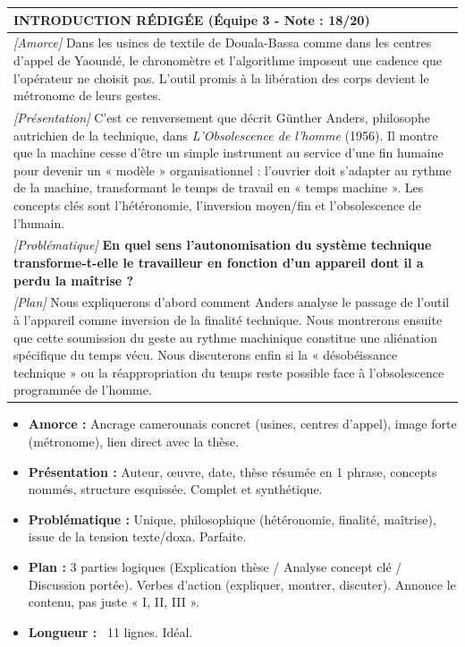 \documentclass[11pt]{article}
\begin{document}
\begin{exoresolu}
\begin{center}
\begin{tabularx}{\linewidth}{|X|}
\hline
\textbf{INTRODUCTION RÉDIGÉE (Équipe 3 - Note : 18/20)} \\ \hline
\textit{[Amorce]} Dans les usines de textile de Douala-Bassa comme dans les centres d'appel de Yaoundé, le chronomètre et l'algorithme imposent une cadence que l'opérateur ne choisit pas. L'outil promis à la libération des corps devient le métronome de leurs gestes. \\
\textit{[Présentation]} C'est ce renversement que décrit Günther Anders, philosophe autrichien de la technique, dans \emph{L'Obsolescence de l'homme} (1956). Il montre que la machine cesse d'être un simple instrument au service d'une fin humaine pour devenir un « modèle » organisationnel : l'ouvrier doit s'adapter au rythme de la machine, transformant le temps de travail en « temps machine ». Les concepts clés sont l'hétéronomie, l'inversion moyen/fin et l'obsolescence de l'humain. \\
\textit{[Problématique]} \textbf{En quel sens l'autonomisation du système technique transforme-t-elle le travailleur en fonction d'un appareil dont il a perdu la maîtrise ?} \\
\textit{[Plan]} Nous expliquerons d'abord comment Anders analyse le passage de l'outil à l'appareil comme inversion de la finalité technique. Nous montrerons ensuite que cette soumission du geste au rythme machinique constitue une aliénation spécifique du temps vécu. Nous discuterons enfin si la « désobéissance technique » ou la réappropriation du temps reste possible face à l'obsolescence programmée de l'homme. \\
\hline
\end{tabularx}
\end{center}
\end{exoresolu}

\begin{corrige}
\begin{itemize}
    \item \textbf{Amorce :} Ancrage camerounais concret (usines, centres d'appel), image forte (métronome), lien direct avec la thèse.
    \item \textbf{Présentation :} Auteur, œuvre, date, thèse résumée en 1 phrase, concepts nommés, structure esquissée. Complet et synthétique.
    \item \textbf{Problématique :} Unique, philosophique (hétéronomie, finalité, maîtrise), issue de la tension texte/doxa. Parfaite.
    \item \textbf{Plan :} 3 parties logiques (Explication thèse / Analyse concept clé / Discussion portée). Verbes d'action (expliquer, montrer, discuter). Annonce le contenu, pas juste « I, II, III ».
    \item \textbf{Longueur :} ~11 lignes. Idéal.
\end{itemize}
\end{corrige}
\end{document}
